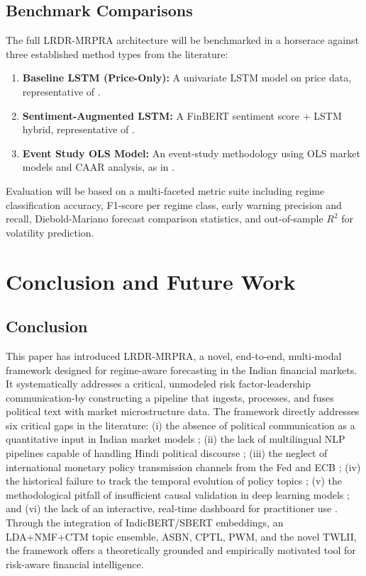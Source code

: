 \documentclass[11pt]{article}
\begin{document}
\subsection{Benchmark Comparisons}
The full LRDR-MRPRA architecture will be benchmarked in a horserace against three established method types from the literature:
\begin{enumerate}[leftmargin=*, itemsep=0pt, topsep=4pt]
    \item \textbf{Baseline LSTM (Price-Only):} A univariate LSTM model on price data, representative of \cite{kumar2024}.
    \item \textbf{Sentiment-Augmented LSTM:} A FinBERT sentiment score + LSTM hybrid, representative of \cite{bhandari2025}.
    \item \textbf{Event Study OLS Model:} An event-study methodology using OLS market models and CAAR analysis, as in \cite{srivastava2019}.
\end{enumerate}
Evaluation will be based on a multi-faceted metric suite including regime classification accuracy, F1-score per regime class, early warning precision and recall, Diebold-Mariano forecast comparison statistics, and out-of-sample $R^2$ for volatility prediction.

\section{Conclusion and Future Work}
\label{sec:conclusion}

\subsection{Conclusion}
This paper has introduced LRDR-MRPRA, a novel, end-to-end, multi-modal framework designed for regime-aware forecasting in the Indian financial markets. It systematically addresses a critical, unmodeled risk factor-leadership communication-by constructing a pipeline that ingests, processes, and fuses political text with market microstructure data. The framework directly addresses six critical gaps in the literature: (i) the absence of political communication as a quantitative input in Indian market models \cite{srivastava2019, kumar2024}; (ii) the lack of multilingual NLP pipelines capable of handling Hindi political discourse \cite{paul2024}; (iii) the neglect of international monetary policy transmission channels from the Fed and ECB \cite{ruz2024}; (iv) the historical failure to track the temporal evolution of policy topics \cite{buehlmaier2018}; (v) the methodological pitfall of insufficient causal validation in deep learning models \cite{nazari2025}; and (vi) the lack of an interactive, real-time dashboard for practitioner use \cite{biswal2022}. Through the integration of IndicBERT/SBERT embeddings, an LDA+NMF+CTM topic ensemble, ASBN, CPTL, PWM, and the novel TWLII, the framework offers a theoretically grounded and empirically motivated tool for risk-aware financial intelligence.
\end{document}
